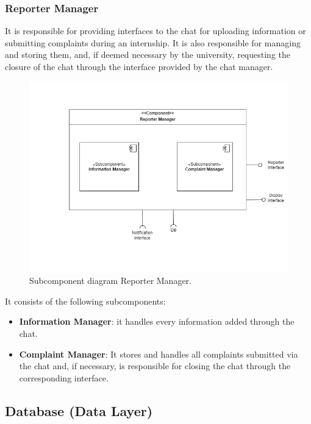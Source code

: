 \subsubsection{Reporter Manager} It is responsible for providing interfaces to the chat for uploading information or submitting complaints during an internship. It is also responsible for managing and storing them, and, if deemed necessary by the university, requesting the closure of the chat through the interface provided by the chat manager.
\begin{figure}[H]
    \centering
    \includegraphics[width=\linewidth]{DD/Images/Comp&Sub/ComplaintManager.png}
    \caption{Subcomponent diagram Reporter Manager.}
    \label{fig:report_manager}
    \end{figure}
    
It consists of the following subcomponents:
\begin{itemize}
    \item  \textbf{Information Manager}: it handles every information added through the chat.
    \item  \textbf{Complaint Manager}: It stores and handles all complaints submitted via the chat and, if necessary, is responsible for closing the chat through the corresponding interface.
    \end{itemize}

\clearpage %

\subsection{Database (Data Layer)}
\label{subsec:data_layer}%


